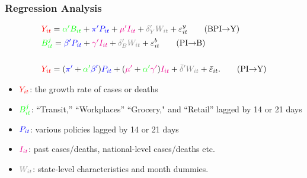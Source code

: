 \documentclass{beamer}
\def\bcolor{\color{green}}
\def\pcolor{\color{blue}}
\def\icolor{\color{magenta}}
\def\wcolor{\color{gray}}
\def\ycolor{\color{red}}
\renewcommand{\to}{{\rightarrow}}
\begin{document}
\begin{frame}
  \frametitle{Regression Analysis}

	\begin{align}
   &  {\ycolor  Y_{it}}
    = {\bcolor\alpha ' B_{it}} + {\pcolor\pi 'P_{it}} + {\icolor\mu'I_{it}} + {\wcolor\delta_Y 'W_{it}}  + \varepsilon^y_{it} \tag{BPI$\to$Y}\\
    &  {\bcolor B_{it}^j}
     =  {\pcolor \beta' P_{it}} + {\icolor \gamma'I_{it}} +  {\wcolor \delta_B' W_{it}} + \varepsilon^b_{it} \tag{PI$\to$B}\\
   \notag  \\
 &  {\ycolor  Y_{it}}
   = ( {\pcolor\pi'}+ {\bcolor\alpha '}  {\pcolor \beta' }  )
    {\pcolor P_{it}} + (  {\icolor  \mu'}+{\bcolor\alpha '}  {\icolor \gamma'})
    {\icolor I_{it} }+ {\wcolor \bar \delta 'W_{it}}  + \bar \varepsilon_{it}. \tag{PI$\to$Y}
       \end{align}

\begin{itemize}
\item ${\ycolor Y_{it}}$:  the growth rate of cases or deaths\smallskip
\item   ${\bcolor B_{it}^j}$:  ``Transit,''  ``Workplaces''  ``Grocery," and ``Retail''  lagged by 14 or 21 days\smallskip
\item  $ {\pcolor  P_{it}} $:  various policies  lagged by 14 or 21 days\smallskip
\item $ {\icolor I_{it}} $: past cases/deaths,  national-level cases/deaths etc.\smallskip
\item $ {\wcolor   W_{it}}$: state-level characteristics   and month dummies.
\end{itemize}


\end{frame}
\end{document}
